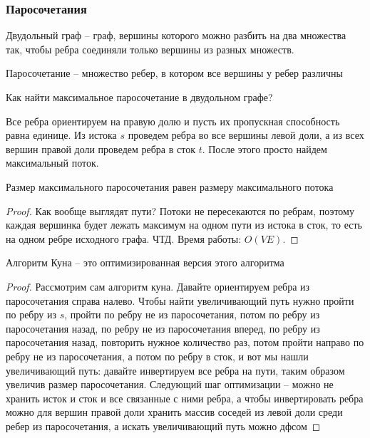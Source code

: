 \subsubsection{Паросочетания}

\begin{definition}
    Двудольный граф -- граф, вершины которого можно разбить на два множества так, чтобы ребра соединяли только вершины из разных множеств.
\end{definition}

\begin{definition}
    Паросочетание -- множество ребер, в котором все вершины у ребер различны
\end{definition}

\begin{problem}
    Как найти максимальное паросочетание в двудольном графе?
\end{problem}

\begin{solution}
    Все ребра ориентируем на правую долю и пусть их пропускная способность равна единице. Из истока $s$ проведем ребра во все вершины левой доли, а из всех вершин правой доли проведем ребра в сток $t$. После этого просто найдем максимальный поток.
\end{solution}

\begin{proposition}
    Размер максимального паросочетания равен размеру максимального потока
\end{proposition}
\begin{proof}
    Как вообще выглядят пути? Потоки не пересекаются по ребрам, поэтому каждая вершинка будет лежать максимум на одном пути из истока в сток, то есть на одном ребре исходного графа. ЧТД. Время работы: $O(VE)$.
\end{proof}

\begin{proposition}
    Алгоритм Куна -- это оптимизированная версия этого алгоритма
\end{proposition}

\begin{proof}
    Рассмотрим сам алгоритм куна. Давайте ориентируем ребра из паросочетания справа налево. Чтобы найти увеличивающий путь нужно пройти по ребру из $s$, пройти по ребру не из паросочетания, потом по ребру из паросочетания назад, по ребру не из паросочетания вперед, по ребру из паросочетания назад, повторить нужное количество раз, потом пройти направо по ребру не из паросочетания, а потом по ребру в сток, и вот мы нашли увеличивающий путь: давайте инвертируем все ребра на пути, таким образом увеличив размер паросочетания. Следующий шаг оптимизации -- можно не хранить исток и сток и все связанные с ними ребра, а чтобы инвертировать ребра можно для вершин правой доли хранить массив соседей из левой доли среди ребер из паросочетания, а искать увеличивающий путь можно дфсом
\end{proof}

